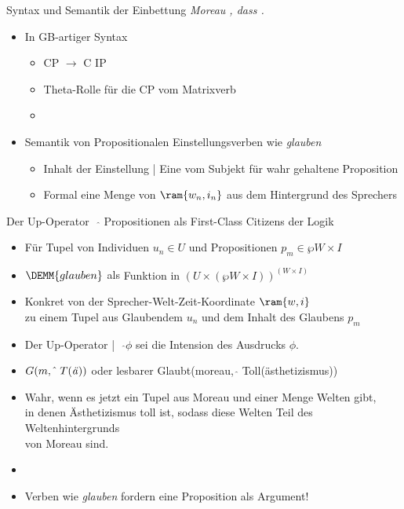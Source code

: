 \begin{frame}
  {Syntax und Semantik der Einbettung}
  \onslide<+->
  \onslide<+->
  \textit{Moreau , \alert{dass} .}\\
  \Halbzeile
  \begin{itemize}[<+->]
    \item In GB-artiger Syntax
      \begin{itemize}[<+->]
        \item \alert{CP $\rightarrow$ C IP}
        \item Theta-Rolle für die CP vom Matrixverb
        \item {}
      \end{itemize}
      \Halbzeile
    \item Semantik von \alert{Propositionalen Einstellungsverben} wie \textit{glauben}
      \begin{itemize}[<+->]
        \item Inhalt der Einstellung | Eine vom Subjekt für wahr gehaltene Proposition
        \item Formal \alert{eine Menge von $\ram{w_n,i_n}$ aus dem Hintergrund des Sprechers}
      \end{itemize}
  \end{itemize}
\end{frame}

\begin{frame}
  {Der Up-Operator\ \ $\hat{ }$}
  \onslide<+->
  \onslide<+->
  Propositionen  als First-Class Citizens der Logik\\
  \Halbzeile
  \begin{itemize}[<+->]
    \item Für Tupel von \alert{Individuen $u_n\in U$} und \alert{Propositionen $p_m\in\wp W\times I$}
    \item $\DEMM{glauben}$ als \alert{Funktion in $(U\times(\wp W\times I))^{(W\times I)}$}
    \item Konkret von der Sprecher-Welt-Zeit-Koordinate $\ram{w,i}$\\
      zu einem Tupel aus Glaubendem $u_n$ und dem Inhalt des Glaubens $p_m$
      \Halbzeile
    \item Der Up-Operator |\ \ \alert{$\hat{ }\phi$} sei die \alert{Intension des Ausdrucks $\phi$}.
    \item \alert{$G(m, \hat{\ }\ T(\text{\textit{ä}}))$} oder lesbarer \alert{Glaubt(moreau, $\hat{\ }\ $Toll(ästhetizismus))}
    \item Wahr, wenn es jetzt ein Tupel aus Moreau und einer Menge Welten gibt,\\
      in denen Ästhetizismus toll ist, sodass diese Welten Teil des Weltenhintergrunds\\
      von Moreau sind.
    \item {}
    \item Verben wie \textit{glauben} fordern eine Proposition als Argument!
  \end{itemize}
\end{frame}


